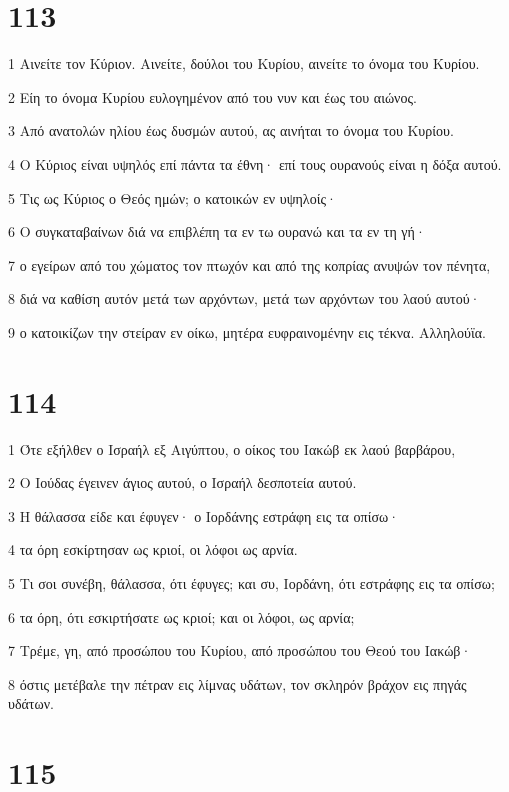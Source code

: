 \chapter{113}

\par 1 Αινείτε τον Κύριον. Αινείτε, δούλοι του Κυρίου, αινείτε το όνομα του Κυρίου.
\par 2 Είη το όνομα Κυρίου ευλογημένον από του νυν και έως του αιώνος.
\par 3 Από ανατολών ηλίου έως δυσμών αυτού, ας αινήται το όνομα του Κυρίου.
\par 4 Ο Κύριος είναι υψηλός επί πάντα τα έθνη· επί τους ουρανούς είναι η δόξα αυτού.
\par 5 Τις ως Κύριος ο Θεός ημών; ο κατοικών εν υψηλοίς·
\par 6 Ο συγκαταβαίνων διά να επιβλέπη τα εν τω ουρανώ και τα εν τη γή·
\par 7 ο εγείρων από του χώματος τον πτωχόν και από της κοπρίας ανυψών τον πένητα,
\par 8 διά να καθίση αυτόν μετά των αρχόντων, μετά των αρχόντων του λαού αυτού·
\par 9 ο κατοικίζων την στείραν εν οίκω, μητέρα ευφραινομένην εις τέκνα. Αλληλούϊα.

\chapter{114}

\par 1 Ότε εξήλθεν ο Ισραήλ εξ Αιγύπτου, ο οίκος του Ιακώβ εκ λαού βαρβάρου,
\par 2 Ο Ιούδας έγεινεν άγιος αυτού, ο Ισραήλ δεσποτεία αυτού.
\par 3 Η θάλασσα είδε και έφυγεν· ο Ιορδάνης εστράφη εις τα οπίσω·
\par 4 τα όρη εσκίρτησαν ως κριοί, οι λόφοι ως αρνία.
\par 5 Τι σοι συνέβη, θάλασσα, ότι έφυγες; και συ, Ιορδάνη, ότι εστράφης εις τα οπίσω;
\par 6 τα όρη, ότι εσκιρτήσατε ως κριοί; και οι λόφοι, ως αρνία;
\par 7 Τρέμε, γη, από προσώπου του Κυρίου, από προσώπου του Θεού του Ιακώβ·
\par 8 όστις μετέβαλε την πέτραν εις λίμνας υδάτων, τον σκληρόν βράχον εις πηγάς υδάτων.

\chapter{115}

